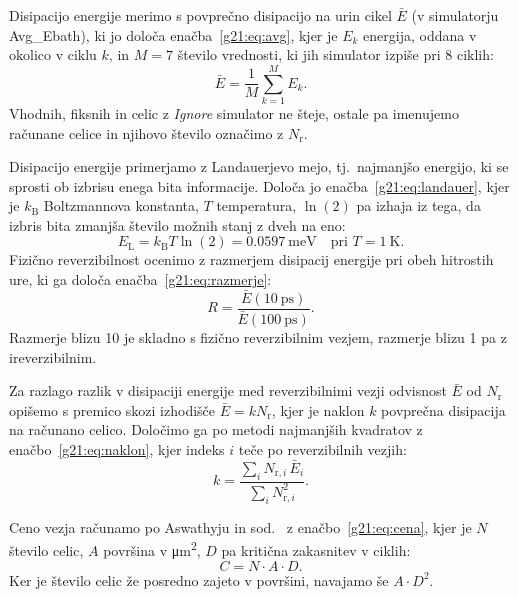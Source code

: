 \documentclass[graybox, envcountchap]{svmult}
\begin{document}
Disipacijo energije merimo s povprečno disipacijo na urin cikel $\bar{E}$ (v simulatorju Avg\_Ebath), ki jo določa enačba~\eqref{g21:eq:avg}, kjer je $E_k$ energija, oddana v okolico v ciklu $k$, in $M = 7$ število vrednosti, ki jih simulator izpiše pri 8 ciklih:
\begin{equation}
\bar{E} = \frac{1}{M}\sum_{k=1}^{M} E_k.
\label{g21:eq:avg}
\end{equation}
Vhodnih, fiksnih in celic z \emph{Ignore} simulator ne šteje, ostale pa imenujemo računane celice in njihovo število označimo z $N_\mathrm{r}$.

Disipacijo energije primerjamo z Landauerjevo mejo, tj.\ najmanjšo energijo, ki se sprosti ob izbrisu enega bita informacije. Določa jo enačba~\eqref{g21:eq:landauer}, kjer je $k_\mathrm{B}$ Boltzmannova konstanta, $T$ temperatura, $\ln(2)$ pa izhaja iz tega, da izbris bita zmanjša število možnih stanj z dveh na eno:
\begin{equation}
E_\mathrm{L} = k_\mathrm{B} T \ln(2) = \SI{0.0597}{\milli\electronvolt} \quad \text{pri } T = \SI{1}{\kelvin}.
\label{g21:eq:landauer}
\end{equation}
Fizično reverzibilnost ocenimo z razmerjem disipacij energije pri obeh hitrostih ure, ki ga določa enačba~\eqref{g21:eq:razmerje}:
\begin{equation}
R = \frac{\bar{E}(\SI{10}{\pico\second})}{\bar{E}(\SI{100}{\pico\second})}.
\label{g21:eq:razmerje}
\end{equation}
Razmerje blizu 10 je skladno s fizično reverzibilnim vezjem, razmerje blizu 1 pa z ireverzibilnim.

Za razlago razlik v disipaciji energije med reverzibilnimi vezji odvisnost $\bar{E}$ od $N_\mathrm{r}$ opišemo s premico skozi izhodišče $\bar{E} = k N_\mathrm{r}$, kjer je naklon $k$ povprečna disipacija na računano celico. Določimo ga po metodi najmanjših kvadratov z enačbo~\eqref{g21:eq:naklon}, kjer indeks $i$ teče po reverzibilnih vezjih:
\begin{equation}
k = \frac{\sum_i N_{\mathrm{r},i}\,\bar{E}_i}{\sum_i N_{\mathrm{r},i}^2}.
\label{g21:eq:naklon}
\end{equation}

Ceno vezja računamo po Aswathyju in sod.~\cite{aswathy2024} z enačbo~\eqref{g21:eq:cena}, kjer je $N$ število celic, $A$ površina v \si{\micro\metre\squared}, $D$ pa kritična zakasnitev v ciklih:
\begin{equation}
C = N \cdot A \cdot D.
\label{g21:eq:cena}
\end{equation}
Ker je število celic že posredno zajeto v površini, navajamo še $A \cdot D^2$.
\end{document}
